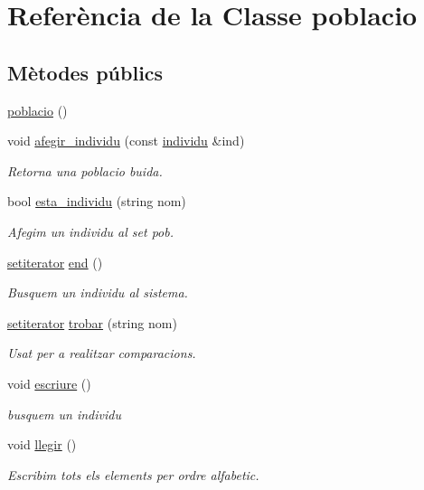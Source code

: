 \hypertarget{classpoblacio}{}\section{Referència de la Classe poblacio}
\label{classpoblacio}
\subsection*{Mètodes públics}
\begin{DoxyCompactItemize}
\item 
\hyperlink{classpoblacio_a8d6ad7ce285dd47c9cfd806e302d7086}{poblacio} ()
\item 
void \hyperlink{classpoblacio_a4b276498dce7806435f5da6c0bb1b497}{afegir\+\_\+individu} (const \hyperlink{classindividu}{individu} \&ind)
\begin{DoxyCompactList}\small\item\em Retorna una poblacio buida. \end{DoxyCompactList}\item 
bool \hyperlink{classpoblacio_a9c6fe58f2cbd06574070df2ef4076015}{esta\+\_\+individu} (string nom)
\begin{DoxyCompactList}\small\item\em Afegim un individu al set pob. \end{DoxyCompactList}\item 
\hyperlink{main_8cc_a54fb6ab8ec9e9336d208b860dca1513d}{setiterator} \hyperlink{classpoblacio_a79328c3b7f2aae028241a3c3acb27f26}{end} ()
\begin{DoxyCompactList}\small\item\em Busquem un individu al sistema. \end{DoxyCompactList}\item 
\hyperlink{main_8cc_a54fb6ab8ec9e9336d208b860dca1513d}{setiterator} \hyperlink{classpoblacio_a6534584e7b9b47c8e1f5f800851daef7}{trobar} (string nom)
\begin{DoxyCompactList}\small\item\em Usat per a realitzar comparacions. \end{DoxyCompactList}\item 
void \hyperlink{classpoblacio_aef82aca848d299bc5eff6d6b479a5081}{escriure} ()
\begin{DoxyCompactList}\small\item\em busquem un individu \end{DoxyCompactList}\item 
void \hyperlink{classpoblacio_a0fbbb44255553f61cf18af398ad92061}{llegir} ()
\begin{DoxyCompactList}\small\item\em Escribim tots els elements per ordre alfabetic. \end{DoxyCompactList}\end{DoxyCompactItemize}


